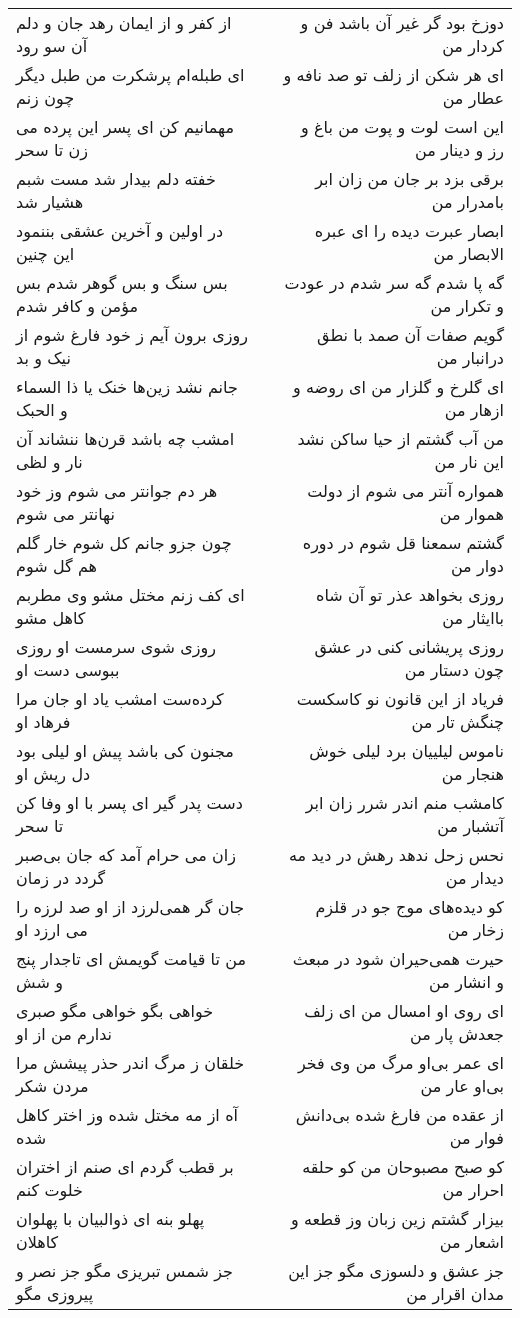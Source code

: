 \begin{center}
\begin{longtable}{l p{0.5cm} r}
از کفر و از ایمان رهد جان و دلم آن سو رود
&&
دوزخ بود گر غیر آن باشد فن و کردار من
\\
ای طبله‌ام پرشکرت من طبل دیگر چون زنم
&&
ای هر شکن از زلف تو صد نافه و عطار من
\\
مهمانیم کن ای پسر این پرده می زن تا سحر
&&
این است لوت و پوت من باغ و رز و دینار من
\\
خفته دلم بیدار شد مست شبم هشیار شد
&&
برقی بزد بر جان من زان ابر بامدرار من
\\
در اولین و آخرین عشقی بننمود این چنین
&&
ابصار عبرت دیده را ای عبره الابصار من
\\
بس سنگ و بس گوهر شدم بس مؤمن و کافر شدم
&&
گه پا شدم گه سر شدم در عودت و تکرار من
\\
روزی برون آیم ز خود فارغ شوم از نیک و بد
&&
گویم صفات آن صمد با نطق درانبار من
\\
جانم نشد زین‌ها خنک یا ذا السماء و الحبک
&&
ای گلرخ و گلزار من ای روضه و ازهار من
\\
امشب چه باشد قرن‌ها ننشاند آن نار و لظی
&&
من آب گشتم از حیا ساکن نشد این نار من
\\
هر دم جوانتر می شوم وز خود نهانتر می شوم
&&
همواره آنتر می شوم از دولت هموار من
\\
چون جزو جانم کل شوم خار گلم هم گل شوم
&&
گشتم سمعنا قل شوم در دوره دوار من
\\
ای کف زنم مختل مشو وی مطربم کاهل مشو
&&
روزی بخواهد عذر تو آن شاه باایثار من
\\
روزی شوی سرمست او روزی ببوسی دست او
&&
روزی پریشانی کنی در عشق چون دستار من
\\
کرده‌ست امشب یاد او جان مرا فرهاد او
&&
فریاد از این قانون نو کاسکست چنگش تار من
\\
مجنون کی باشد پیش او لیلی بود دل ریش او
&&
ناموس لیلییان برد لیلی خوش هنجار من
\\
دست پدر گیر ای پسر با او وفا کن تا سحر
&&
کامشب منم اندر شرر زان ابر آتشبار من
\\
زان می حرام آمد که جان بی‌صبر گردد در زمان
&&
نحس زحل ندهد رهش در دید مه دیدار من
\\
جان گر همی‌لرزد از او صد لرزه را می ارزد او
&&
کو دیده‌های موج جو در قلزم زخار من
\\
من تا قیامت گویمش ای تاجدار پنج و شش
&&
حیرت همی‌حیران شود در مبعث و انشار من
\\
خواهی بگو خواهی مگو صبری ندارم من از او
&&
ای روی او امسال من ای زلف جعدش پار من
\\
خلقان ز مرگ اندر حذر پیشش مرا مردن شکر
&&
ای عمر بی‌او مرگ من وی فخر بی‌او عار من
\\
آه از مه مختل شده وز اختر کاهل شده
&&
از عقده من فارغ شده بی‌دانش فوار من
\\
بر قطب گردم ای صنم از اختران خلوت کنم
&&
کو صبح مصبوحان من کو حلقه احرار من
\\
پهلو بنه ای ذوالبیان با پهلوان کاهلان
&&
بیزار گشتم زین زبان وز قطعه و اشعار من
\\
جز شمس تبریزی مگو جز نصر و پیروزی مگو
&&
جز عشق و دلسوزی مگو جز این مدان اقرار من
\\
\end{longtable}
\end{center}
